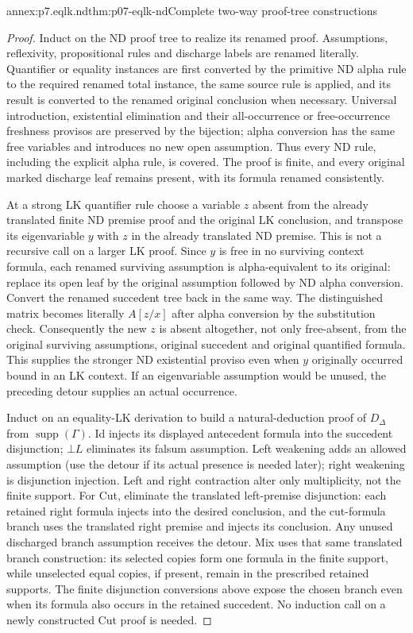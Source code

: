 \begin{annexitem}{annex:p7.eqlk.nd}{thm:p07-eqlk-nd}{Complete two-way proof-tree constructions}
\begin{proof}
Induct on the ND proof tree to realize its renamed proof. Assumptions,
reflexivity, propositional rules and discharge labels are renamed literally.
Quantifier or equality instances are first converted by the primitive ND
alpha rule to the required renamed total instance, the same source rule
is applied, and its result is converted to the renamed original conclusion
when necessary. Universal introduction, existential elimination and their
all-occurrence or free-occurrence freshness provisos are preserved by the
bijection; alpha conversion has the same free variables and introduces
no new open assumption. Thus every ND rule, including the explicit alpha
rule, is covered. The proof is finite, and every original marked discharge
leaf remains present, with its formula renamed consistently.

At a strong LK quantifier rule choose a variable \(z\) absent from the
already translated finite ND premise proof and the original LK conclusion,
and transpose its eigenvariable
\(y\) with \(z\) in the already translated ND premise. This is not a
recursive call on a larger LK proof. Since \(y\) is free in no surviving
context formula, each renamed surviving assumption is alpha-equivalent
to its original: replace its open leaf by the original assumption followed
by ND alpha conversion. Convert the renamed succedent tree back in the
same way. The distinguished matrix becomes literally \(A[z/x]\)
after alpha conversion by the substitution check. Consequently the
new \(z\) is absent altogether, not only free-absent, from the original
surviving assumptions, original succedent and original quantified formula.
This supplies the stronger ND existential proviso even when \(y\)
originally occurred bound in an LK context. If an eigenvariable assumption
would be unused, the preceding detour supplies an actual occurrence.

Induct on an equality-LK derivation to build a natural-deduction proof of
\(D_\Delta\) from \(\operatorname{supp}(\Gamma)\).
Id injects its displayed antecedent formula into the succedent disjunction;
\(\bot L\) eliminates its falsum assumption. Left weakening adds an
allowed assumption (use the detour if its actual presence is needed later);
right weakening is disjunction injection. Left and right contraction
alter only multiplicity, not the finite support. For Cut, eliminate the
translated left-premise disjunction: each retained right formula injects
into the desired conclusion, and the cut-formula branch uses the translated
right premise and injects its conclusion. Any unused discharged branch
assumption receives the detour. Mix uses that same translated branch
construction: its selected copies form one formula in the finite support,
while unselected equal copies, if present, remain in the prescribed
retained supports. The finite disjunction conversions above expose the
chosen branch even when its formula also occurs in the retained succedent.
No induction call on a newly constructed Cut proof is needed.


\end{proof}
\end{annexitem}
